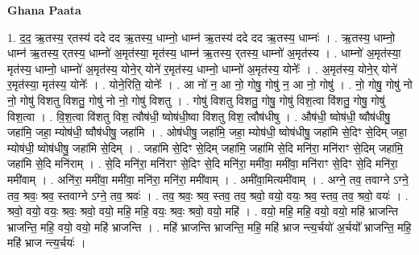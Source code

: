 \documentclass[17pt]{extarticle}
\begin{document}
\textbf{Ghana Paata } \newline

1. द॒द॒ ऋ॒तस्य॒ र्‌तस्य॑ ददे दद ऋ॒तस्य॒ धाम्नो॒ धाम्न॑ ऋ॒तस्य॑ ददे दद ऋ॒तस्य॒ धाम्नः॑ । . ऋ॒तस्य॒ धाम्नो॒ धाम्न॑ ऋ॒तस्य॒ र्‌तस्य॒ धाम्नो॑ अ॒मृत॑स्या॒ मृत॑स्य॒ धाम्न॑ ऋ॒तस्य॒ र्‌तस्य॒ धाम्नो॑ अ॒मृत॑स्य । . धाम्नो॑ अ॒मृत॑स्या॒ मृत॑स्य॒ धाम्नो॒ धाम्नो॑ अ॒मृत॑स्य॒ योने॒र् योने॑ र॒मृत॑स्य॒ धाम्नो॒ धाम्नो॑ अ॒मृत॑स्य॒ योनेः᳚ । . अ॒मृत॑स्य॒ योने॒र् योने॑ र॒मृत॑स्या॒ मृत॑स्य॒ योनेः᳚ । . योने॒रिति॒ योनेः᳚ । . आ नो॑ न॒ आ नो॒ गोषु॒ गोषु॑ न॒ आ नो॒ गोषु॑ । . नो॒ गोषु॒ गोषु॑ नो नो॒ गोषु॑ विशतु विशतु॒ गोषु॑ नो नो॒ गोषु॑ विशतु । . गोषु॑ विशतु विशतु॒ गोषु॒ गोषु॑ विश॒त्वा वि॑शतु॒ गोषु॒ गोषु॑ विश॒त्वा । . वि॒श॒त्वा वि॑शतु विश॒ त्वौष॑धी॒ ष्वोष॑धी॒ष्वा वि॑शतु विश॒ त्वौष॑धीषु । . औष॑धी॒ ष्वोष॑धी॒ ष्वौष॑धीषु॒ जहा॑मि॒ जहा॒ म्योष॑धी॒ ष्वौष॑धीषु॒ जहा॑मि । . ओष॑धीषु॒ जहा॑मि॒ जहा॒ म्योष॑धी॒ ष्वोष॑धीषु॒ जहा॑मि से॒दिꣳ से॒दिम् जहा॒ म्योष॑धी॒ ष्वोष॑धीषु॒ जहा॑मि से॒दिम् । . जहा॑मि से॒दिꣳ से॒दिम् जहा॑मि॒ जहा॑मि से॒दि मनि॑रा॒ मनि॑राꣳ से॒दिम् जहा॑मि॒ जहा॑मि से॒दि मनि॑राम् । . से॒दि मनि॑रा॒ मनि॑राꣳ से॒दिꣳ से॒दि मनि॑रा॒ ममी॑वा॒ ममी॑वा॒ मनि॑राꣳ से॒दिꣳ से॒दि मनि॑रा॒ ममी॑वाम् । . अनि॑रा॒ ममी॑वा॒ ममी॑वा॒ मनि॑रा॒ मनि॑रा॒ ममी॑वाम् । . अमी॑वा॒मित्यमी॑वाम् । . अग्ने॒ तव॒ तवाग्ने ऽग्ने॒ तव॒ श्रवः॒ श्रव॒ स्तवाग्ने ऽग्ने॒ तव॒ श्रवः॑ । . तव॒ श्रवः॒ श्रव॒ स्तव॒ तव॒ श्रवो॒ वयो॒ वयः॒ श्रव॒ स्तव॒ तव॒ श्रवो॒ वयः॑ । . श्रवो॒ वयो॒ वयः॒ श्रवः॒ श्रवो॒ वयो॒ महि॒ महि॒ वयः॒ श्रवः॒ श्रवो॒ वयो॒ महि॑ । . वयो॒ महि॒ महि॒ वयो॒ वयो॒ महि॑ भ्राजन्ति भ्राजन्ति॒ महि॒ वयो॒ वयो॒ महि॑ भ्राजन्ति । . महि॑ भ्राजन्ति भ्राजन्ति॒ महि॒ महि॑ भ्राज न्त्य॒र्चयो॑ अ॒र्चयो᳚ भ्राजन्ति॒ महि॒ महि॑ भ्राज न्त्य॒र्चयः॑ । \newline
\end{document}
